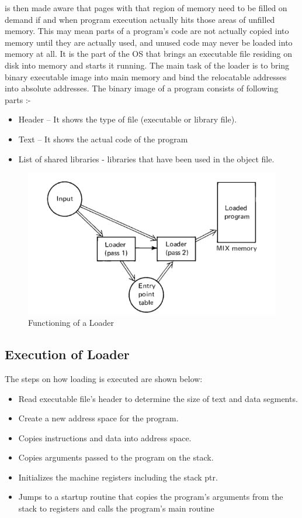 \documentclass[a4paper,12pt]{extarticle}
\begin{document}
	is then made aware that pages with that region of memory need to be filled on
	demand if and when program execution actually hits those areas of unfilled memory.
	This may mean parts of a program’s code are not actually copied into memory until
	they are actually used, and unused code may never be loaded into memory at all.
	It is the part of the OS that brings an executable file residing on disk into memory
	and starts it running.
	The main task of the loader is to bring binary executable image into main memory
	and bind the relocatable addresses into absolute addresses.
	\newline\newline
	The binary image of a program consists of following parts :-
	\begin{itemize}
		\item  Header – It shows the type of file (executable or library file).
		\item  Text – It shows the actual code of the program
		\item  List of shared libraries - libraries that have been used in the object file.
	\end{itemize}
\begin{figure}[h!]
	\includegraphics[width=\linewidth]{loader.png}
	\caption{Functioning of a Loader}
	\label{fig:loader}
\end{figure}
	\subsection{Execution of Loader}
	The steps on how loading is executed are shown below:
	\begin{itemize}
		\item Read executable file’s header to determine the size of text and data segments.
		\item Create a new address space for the program.
		\item Copies instructions and data into address space.
		\item Copies arguments passed to the program on the stack.
		\item Initializes the machine registers including the stack ptr.
		\item Jumps to a startup routine that copies the program’s arguments from the stack to registers and calls the program’s main routine
	\end{itemize}
\end{document}
